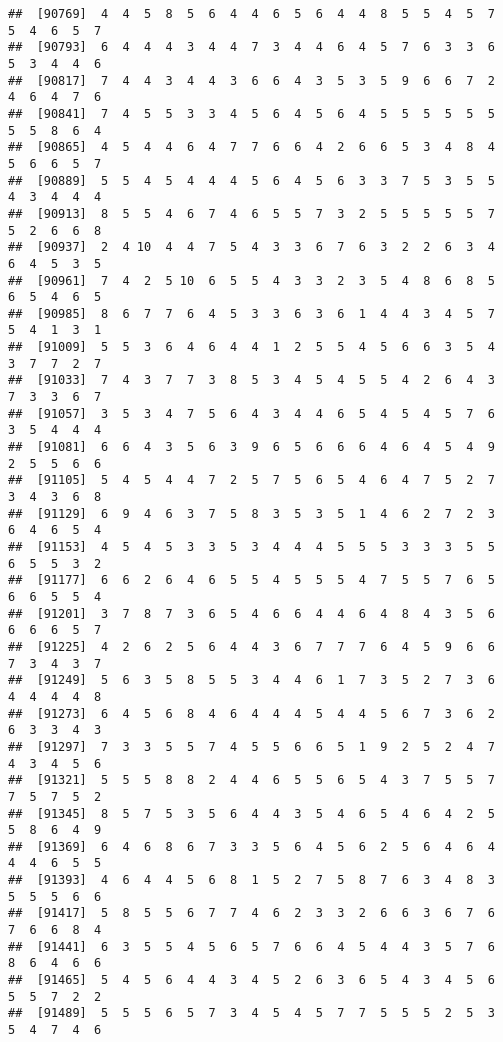 \documentclass[
]{book}
\begin{document}
\begin{verbatim}
##  [90769]  4  4  5  8  5  6  4  4  6  5  6  4  4  8  5  5  4  5  7  5  4  6  5  7
##  [90793]  6  4  4  4  3  4  4  7  3  4  4  6  4  5  7  6  3  3  6  5  3  4  4  6
##  [90817]  7  4  4  3  4  4  3  6  6  4  3  5  3  5  9  6  6  7  2  4  6  4  7  6
##  [90841]  7  4  5  5  3  3  4  5  6  4  5  6  4  5  5  5  5  5  5  5  5  8  6  4
##  [90865]  4  5  4  4  6  4  7  7  6  6  4  2  6  6  5  3  4  8  4  5  6  6  5  7
##  [90889]  5  5  4  5  4  4  4  5  6  4  5  6  3  3  7  5  3  5  5  4  3  4  4  4
##  [90913]  8  5  5  4  6  7  4  6  5  5  7  3  2  5  5  5  5  5  7  5  2  6  6  8
##  [90937]  2  4 10  4  4  7  5  4  3  3  6  7  6  3  2  2  6  3  4  6  4  5  3  5
##  [90961]  7  4  2  5 10  6  5  5  4  3  3  2  3  5  4  8  6  8  5  6  5  4  6  5
##  [90985]  8  6  7  7  6  4  5  3  3  6  3  6  1  4  4  3  4  5  7  5  4  1  3  1
##  [91009]  5  5  3  6  4  6  4  4  1  2  5  5  4  5  6  6  3  5  4  3  7  7  2  7
##  [91033]  7  4  3  7  7  3  8  5  3  4  5  4  5  5  4  2  6  4  3  7  3  3  6  7
##  [91057]  3  5  3  4  7  5  6  4  3  4  4  6  5  4  5  4  5  7  6  3  5  4  4  4
##  [91081]  6  6  4  3  5  6  3  9  6  5  6  6  6  4  6  4  5  4  9  2  5  5  6  6
##  [91105]  5  4  5  4  4  7  2  5  7  5  6  5  4  6  4  7  5  2  7  3  4  3  6  8
##  [91129]  6  9  4  6  3  7  5  8  3  5  3  5  1  4  6  2  7  2  3  6  4  6  5  4
##  [91153]  4  5  4  5  3  3  5  3  4  4  4  5  5  5  3  3  3  5  5  6  5  5  3  2
##  [91177]  6  6  2  6  4  6  5  5  4  5  5  5  4  7  5  5  7  6  5  6  6  5  5  4
##  [91201]  3  7  8  7  3  6  5  4  6  6  4  4  6  4  8  4  3  5  6  6  6  6  5  7
##  [91225]  4  2  6  2  5  6  4  4  3  6  7  7  7  6  4  5  9  6  6  7  3  4  3  7
##  [91249]  5  6  3  5  8  5  5  3  4  4  6  1  7  3  5  2  7  3  6  4  4  4  4  8
##  [91273]  6  4  5  6  8  4  6  4  4  4  5  4  4  5  6  7  3  6  2  6  3  3  4  3
##  [91297]  7  3  3  5  5  7  4  5  5  6  6  5  1  9  2  5  2  4  7  4  3  4  5  6
##  [91321]  5  5  5  8  8  2  4  4  6  5  5  6  5  4  3  7  5  5  7  7  5  7  5  2
##  [91345]  8  5  7  5  3  5  6  4  4  3  5  4  6  5  4  6  4  2  5  5  8  6  4  9
##  [91369]  6  4  6  8  6  7  3  3  5  6  4  5  6  2  5  6  4  6  4  4  4  6  5  5
##  [91393]  4  6  4  4  5  6  8  1  5  2  7  5  8  7  6  3  4  8  3  5  5  5  6  6
##  [91417]  5  8  5  5  6  7  7  4  6  2  3  3  2  6  6  3  6  7  6  7  6  6  8  4
##  [91441]  6  3  5  5  4  5  6  5  7  6  6  4  5  4  4  3  5  7  6  8  6  4  6  6
##  [91465]  5  4  5  6  4  4  3  4  5  2  6  3  6  5  4  3  4  5  6  5  5  7  2  2
##  [91489]  5  5  5  6  5  7  3  4  5  4  5  7  7  5  5  5  2  5  3  5  4  7  4  6

\end{verbatim}
\end{document}
